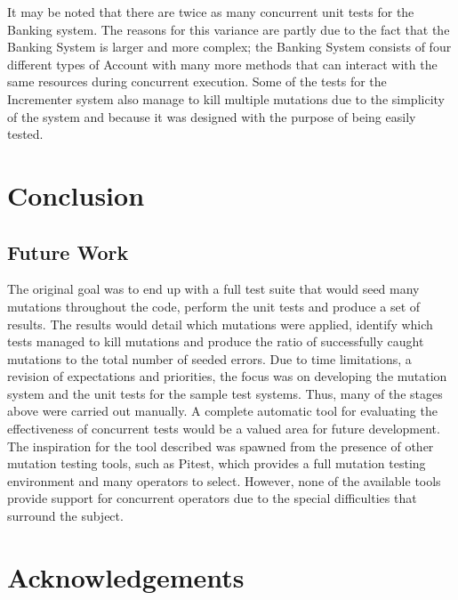 \documentclass[a4paper,12pt]{article}
\begin{document}
It may be noted that there are twice as many concurrent unit tests for the Banking system. The reasons for this variance are partly due to the fact that the Banking System is larger and more complex; the Banking System consists of four different types of Account with many more methods that can interact with the same resources during concurrent execution. Some of the tests for the Incrementer system also manage to kill multiple mutations due to the simplicity of the system and because it was designed with the purpose of being easily tested.   

    
    
\newpage	
\section{Conclusion}

\subsection{Future Work}
The original goal was to end up with a full test suite that would seed many mutations throughout the code, perform the unit tests and produce a set of results. The results would detail which mutations were applied, identify which tests managed to kill mutations and produce the ratio of successfully caught mutations to the total number of seeded errors. Due to time limitations, a revision of expectations and priorities, the focus was on developing the mutation system and the unit tests for the sample test systems. Thus, many of the stages above were carried out manually. A complete automatic tool for evaluating the effectiveness of concurrent tests would be a valued area for future development. The inspiration for the tool described was spawned from the presence of other mutation testing tools, such as Pitest, which provides a full mutation testing environment and many operators to select. However, none of the available tools provide support for concurrent operators due to the special difficulties that surround the subject.
    
\newpage
\section{Acknowledgements}



\newpage
\appendix
\end{document}
